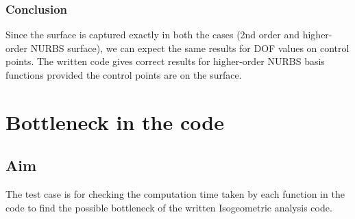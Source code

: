 \documentclass[11pt]{article}
\begin{document}
\subsubsection{Conclusion}
Since the surface is captured exactly in both the cases (2nd order and higher-order NURBS surface), we can expect the same results for DOF values on control points. The written code gives correct results for higher-order NURBS basis functions provided the control points are on the surface.  




 

\newpage
\section{Bottleneck in the code}
\subsection{Aim}
The test case is for checking the computation time taken by each function in the code to find the possible bottleneck of the written Isogeometric analysis code.
\end{document}
